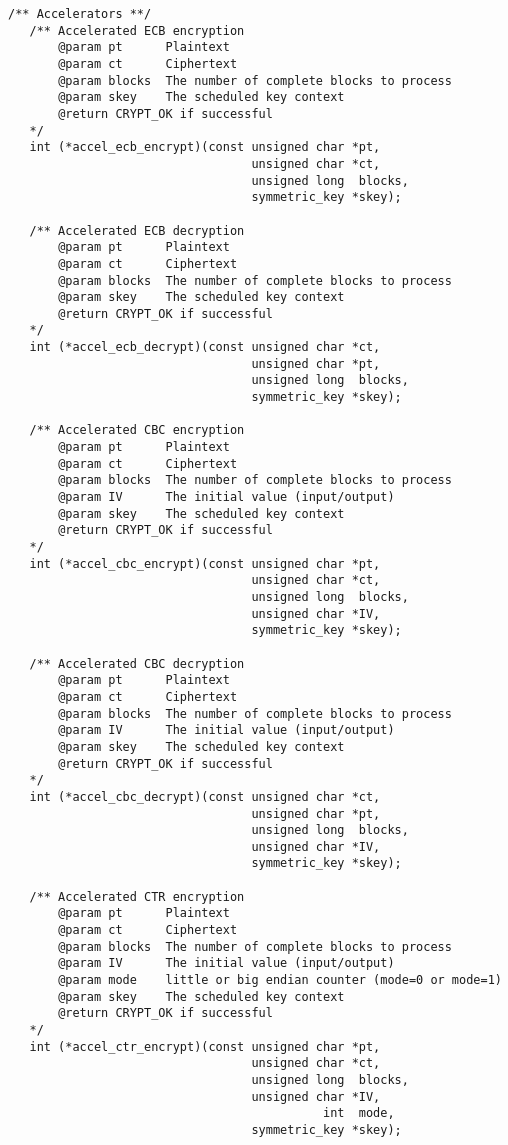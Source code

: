 \documentclass[synpaper]{book}
\begin{document}
\begin{small}
\begin{verbatim}
/** Accelerators **/
   /** Accelerated ECB encryption
       @param pt      Plaintext
       @param ct      Ciphertext
       @param blocks  The number of complete blocks to process
       @param skey    The scheduled key context
       @return CRYPT_OK if successful
   */
   int (*accel_ecb_encrypt)(const unsigned char *pt,
                                  unsigned char *ct,
                                  unsigned long  blocks,
                                  symmetric_key *skey);

   /** Accelerated ECB decryption
       @param pt      Plaintext
       @param ct      Ciphertext
       @param blocks  The number of complete blocks to process
       @param skey    The scheduled key context
       @return CRYPT_OK if successful
   */
   int (*accel_ecb_decrypt)(const unsigned char *ct,
                                  unsigned char *pt,
                                  unsigned long  blocks,
                                  symmetric_key *skey);

   /** Accelerated CBC encryption
       @param pt      Plaintext
       @param ct      Ciphertext
       @param blocks  The number of complete blocks to process
       @param IV      The initial value (input/output)
       @param skey    The scheduled key context
       @return CRYPT_OK if successful
   */
   int (*accel_cbc_encrypt)(const unsigned char *pt,
                                  unsigned char *ct,
                                  unsigned long  blocks,
                                  unsigned char *IV,
                                  symmetric_key *skey);

   /** Accelerated CBC decryption
       @param pt      Plaintext
       @param ct      Ciphertext
       @param blocks  The number of complete blocks to process
       @param IV      The initial value (input/output)
       @param skey    The scheduled key context
       @return CRYPT_OK if successful
   */
   int (*accel_cbc_decrypt)(const unsigned char *ct,
                                  unsigned char *pt,
                                  unsigned long  blocks,
                                  unsigned char *IV,
                                  symmetric_key *skey);

   /** Accelerated CTR encryption
       @param pt      Plaintext
       @param ct      Ciphertext
       @param blocks  The number of complete blocks to process
       @param IV      The initial value (input/output)
       @param mode    little or big endian counter (mode=0 or mode=1)
       @param skey    The scheduled key context
       @return CRYPT_OK if successful
   */
   int (*accel_ctr_encrypt)(const unsigned char *pt,
                                  unsigned char *ct,
                                  unsigned long  blocks,
                                  unsigned char *IV,
                                            int  mode,
                                  symmetric_key *skey);


\end{verbatim}
\end{small}
\end{document}
